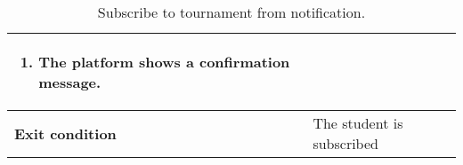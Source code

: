 \begin{enumerate}[label=\textbf{UC\arabic*}:,leftmargin=1.3cm]
\begin{table}[H]
\begin{tabular}{|l|p{11.9cm}|}
\begin{enumerate}[label=\arabic*.]
                              \item The platform shows a confirmation message.
                        \end{enumerate} \\\hline
                        \textbf{Exit condition}  & The student is subscribed                                                             \\\hline
                  \end{tabular}
                  \caption{Subscribe to tournament from notification.}
                  \label{table:Subscribe to tournament from notification}
            \end{table}


\end{enumerate}
